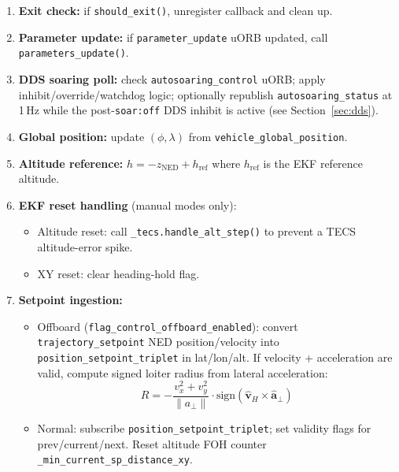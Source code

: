 \documentclass[12pt,a4paper]{article}
\begin{document}
\begin{enumerate}
  \item \textbf{Exit check:} if \texttt{should\_exit()}, unregister callback
        and clean up.
  \item \textbf{Parameter update:} if \texttt{parameter\_update} uORB updated,
        call \texttt{parameters\_update()}.
  \item \textbf{DDS soaring poll:} check \texttt{autosoaring\_control} uORB;
        apply inhibit/override/watchdog logic; optionally republish
        \texttt{autosoaring\_status} at 1\,Hz while the post-\texttt{soar:off}
        DDS inhibit is active (see Section~\ref{sec:dds}).
  \item \textbf{Global position:} update $(\phi, \lambda)$ from
        \texttt{vehicle\_global\_position}.
  \item \textbf{Altitude reference:} $h = -z_{\text{NED}} + h_{\text{ref}}$
        where $h_{\text{ref}}$ is the EKF reference altitude.
  \item \textbf{EKF reset handling} (manual modes only):
        \begin{itemize}
          \item Altitude reset: call \texttt{\_tecs.handle\_alt\_step()} to
                prevent a TECS altitude-error spike.
          \item XY reset: clear heading-hold flag.
        \end{itemize}
  \item \textbf{Setpoint ingestion:}
        \begin{itemize}
          \item Offboard (\texttt{flag\_control\_offboard\_enabled}):
                convert \texttt{trajectory\_setpoint} NED position/velocity
                into \texttt{position\_setpoint\_triplet} in lat/lon/alt.
                If velocity + acceleration are valid, compute signed
                loiter radius from lateral acceleration:
                \begin{equation}
                  R = -\frac{v_x^2 + v_y^2}{\|a_\perp\|}
                  \cdot \text{sign}(\hat{\mathbf{v}}_H \times \hat{\mathbf{a}}_\perp)
                \end{equation}
          \item Normal: subscribe \texttt{position\_setpoint\_triplet};
                set validity flags for prev/current/next.
                Reset altitude FOH counter \texttt{\_min\_current\_sp\_distance\_xy}.
        \end{itemize}

\end{enumerate}
\end{document}
